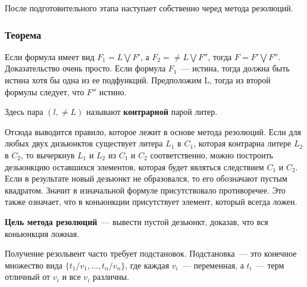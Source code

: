После подготовительного этапа наступает собственно черед метода резолюций.
\subsubsection{Теорема}
Если формула имеет вид $F_1=L\bigvee{}F'$, а $F_2=\neq{}L\bigvee{}F''$, тогда $F=F'\bigvee{}F''$. Доказательство очень просто. Если формула $F_1$~--- истина, тогда должна быть истина хотя бы одна из ее подфункций. Предположим L, тогда из второй формулы следует, что $F''$ истино.

Здесь пара $(l,\neq{}L)$ называют \textbf{контрарной} парой литер.

Отсюда выводится правило, которое лежит в основе метода резолюций. Если для любых двух дизьюнктов существует литера $L_1$ в $C_1$, которая контрарна литере $L_2$ в $C_2$, то вычеркнув $L_1$ и $L_2$ из $C_1$ и $C_2$ соответственно, можно построить дезьюнкцию оставшихся элементов, которая будет являться следствием $C_1$ и $C_2$. Если в результате новый дезьюнкт не образовался, то его обозначают пустым квадратом. Значит в изначальной формуле присутствовало противоречее. Это также означает, что в коньюнкции присутствует элемент, который всегда ложен.

\textbf{Цель метода резолюций}~--- вывести пустой дезьюнкт, доказав, что вся коньюнкция ложная.

Получение резольвент часто требует подстановок. Подстановка~--- это конечное множество вида $\{t_1/v_1,\ldots,t_n/v_n\}$, где каждая $v_i$~--- переменная, а $t_i$~--- терм отличный от $v_i$ и все $v_i$ различны.